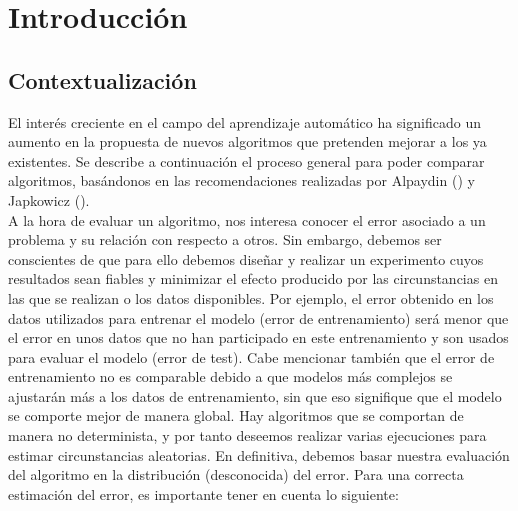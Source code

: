 \chapter{Introducción}
\setcounter{page}{1}

\section{Contextualización}
	
	El interés creciente en el campo del aprendizaje
automático ha significado un aumento en la propuesta
de nuevos algoritmos que pretenden mejorar a los 
ya existentes. Se describe a continuación el proceso
general para poder comparar algoritmos, basándonos en
las recomendaciones realizadas por Alpaydin 
(\cite{Alpaydin:2010:IML:1734076}) y Japkowicz  
(\cite{DBLP:books/cu/Japkowicz2011}).\\
	A la hora de evaluar un algoritmo,
nos interesa conocer el error asociado a un problema y 
su relación con respecto a otros. Sin embargo, debemos ser 
conscientes de que para ello debemos diseñar y realizar un 
experimento cuyos resultados sean fiables y minimizar el 
efecto producido por las circunstancias en las que se 
realizan o los datos disponibles. Por ejemplo, el error 
obtenido en los datos utilizados para entrenar el modelo 
(error de entrenamiento) será menor que el error en unos 
datos que no han participado en este entrenamiento y son 
usados para evaluar el modelo (error de test). Cabe mencionar 
también que el error de entrenamiento no es comparable debido 
a que modelos más complejos se ajustarán más a los datos de 
entrenamiento, sin que eso signifique que el modelo se 
comporte mejor de manera global. Hay algoritmos que se 
comportan de manera no determinista, y por tanto deseemos 
realizar varias ejecuciones para estimar circunstancias 
aleatorias. En definitiva, debemos basar nuestra evaluación 
del algoritmo en la distribución (desconocida) del error. 
Para una correcta estimación del error,  es importante tener en 
cuenta lo siguiente:
	
